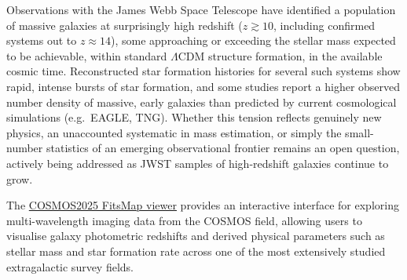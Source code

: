\begin{tipsblock}
Observations with the James Webb Space Telescope have identified a population of massive galaxies at surprisingly high redshift ($z \gtrsim 10$, including confirmed systems out to $z \approx 14$), some approaching or exceeding the stellar mass expected to be achievable, within standard $\Lambda$CDM structure formation, in the available cosmic time. Reconstructed star formation histories for several such systems show rapid, intense bursts of star formation, and some studies report a higher observed number density of massive, early galaxies than predicted by current cosmological simulations (e.g.\ EAGLE, TNG). Whether this tension reflects genuinely new physics, an unaccounted systematic in mass estimation, or simply the small-number statistics of an emerging observational frontier remains an open question, actively being addressed as JWST samples of high-redshift galaxies continue to grow.
\end{tipsblock}

\begin{advancedblock}
The \href{https://cosmos2025.iap.fr/fitsmap}{COSMOS2025 FitsMap viewer} provides an interactive interface for exploring multi-wavelength imaging data from the COSMOS field, allowing users to visualise galaxy photometric redshifts and derived physical parameters such as stellar mass and star formation rate across one of the most extensively studied extragalactic survey fields.
\end{advancedblock}